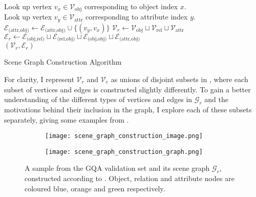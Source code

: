 \begin{algorithm}[htbp]
{{            Look up vertex \(v_x \in \mathcal{V}_\text{obj}\) corresponding to object index \(x\).\\
            Look up vertex \(v_y \in \mathcal{V}_\text{attr}\) corresponding to attribute index \(y\).\\
            \(\mathcal{E}_{\text{(attr,obj)}} \leftarrow \mathcal{E}_{\text{(attr,obj)}} \cup \{(v_y, v_x)\}\)
        }
        \(\mathcal{V}_r \leftarrow \mathcal{V}_\text{obj} \sqcup \mathcal{V}_\text{rel} \sqcup \mathcal{V}_\text{attr}\)\\
        \(\mathcal{E}_r \leftarrow \mathcal{E}_{\text{(obj,rel)}} \sqcup \mathcal{E}_{\text{(rel,obj)}} \sqcup
        \mathcal{E}_{\text{(obj,obj)}} \sqcup
        \mathcal{E}_{\text{(attr,obj)}}\)\\
        \Return \((\mathcal{V}_r, \mathcal{E}_r)\)
    }
    \caption[Scene Graph Construction Algorithm]{Scene Graph Construction Algorithm}
    \label{algorithm:scene_graph_construction}
\end{algorithm}

For clarity, I represent \(\mathcal{V}_r\) and \(\mathcal{V}_e\) as unions of disjoint subsets in \algorithmcfname{ \ref{algorithm:scene_graph_construction}}, where each subset of vertices and edges is constructed slightly differently. To gain a better understanding of the different types of vertices and edges in \(\mathcal{G}_r\) and the motivations behind their inclusion in the graph, I explore each of these subsets separately, giving some examples from \figureautorefname{ \ref{fig:scene_graph_construction}}.

\begin{figure}[htbp]
    \centering
    \begin{subfigure}[l]{0.49\textwidth}
        \texttt{[image: scene\_graph\_construction\_image.png]}
        \label{fig:scene_graph_construction_image}
    \end{subfigure}
    \begin{subfigure}[r]{0.49\textwidth}
        \texttt{[image: scene\_graph\_construction\_graph.png]}
        \label{fig:scene_graph_construction_graph}
    \end{subfigure}
    \caption[An image from the GQA dataset and its corresponding scene graph \(\mathcal{G}_r\).]{A sample from the GQA validation set and its scene graph \(\mathcal{G}_r\), constructed according to \algorithmcfname{ \ref{algorithm:scene_graph_construction}}. Object, relation and attribute nodes are coloured blue, orange and green respectively.}
    \label{fig:scene_graph_construction}
\end{figure}

